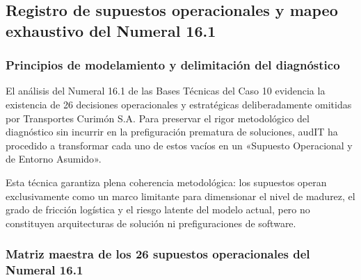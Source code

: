 \subsection{Registro de supuestos operacionales y mapeo exhaustivo del Numeral 16.1}

\subsubsection{Principios de modelamiento y delimitación del diagnóstico}

El análisis del Numeral 16.1 de las Bases Técnicas del Caso 10 \parencite{bases_caso10_2026} evidencia la existencia de 26 decisiones operacionales y estratégicas deliberadamente omitidas por Transportes Curimón S.A. Para preservar el rigor metodológico del diagnóstico sin incurrir en la prefiguración prematura de soluciones, audIT ha procedido a transformar cada uno de estos vacíos en un «Supuesto Operacional y de Entorno Asumido».

Esta técnica garantiza plena coherencia metodológica: los supuestos operan exclusivamente como un marco limitante para dimensionar el nivel de madurez, el grado de fricción logística y el riesgo latente del modelo actual, pero no constituyen arquitecturas de solución ni prefiguraciones de software.

\subsubsection{Matriz maestra de los 26 supuestos operacionales del Numeral 16.1}

